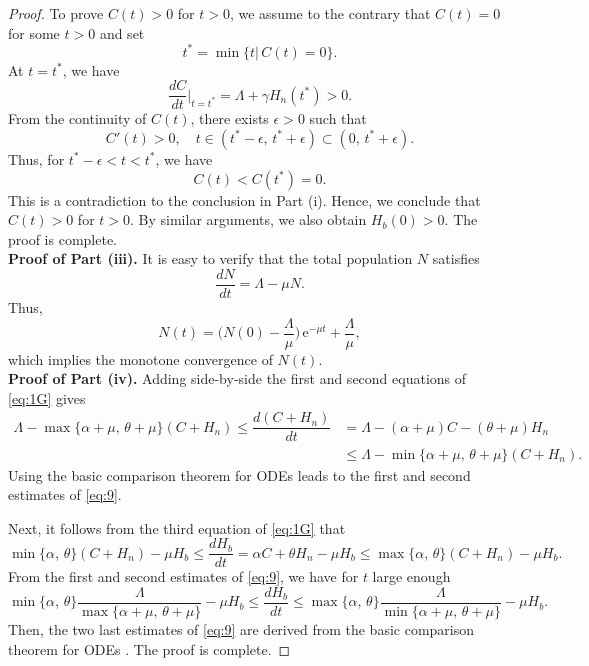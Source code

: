 \documentclass[11pt]{article}
\theoremstyle{definition}
\theoremstyle{remark}
\numberwithin{equation}{section}
\begin{document}
\begin{proof}
To prove $C(t) > 0$ for $t > 0$, we assume to the contrary that $C(t)=0$ for some $t>0$ and set 
\begin{equation*}
     t^* = \min\{t|\, C(t) = 0\}.
\end{equation*}
At $t=t^*$, we have
\begin{equation*}
     \dfrac{dC}{dt}\bigg|_{t = t^*} = \Lambda + \gamma H_n(t^*) > 0.
\end{equation*}
From the continuity of $C(t)$, there exists $\epsilon > 0$ such that
\begin{equation*}
     C'(t) > 0, \quad t \in (t^* - \epsilon,\,t^* + \epsilon) \subset (0,\,t^*+\epsilon).
\end{equation*}
Thus, for $t^* - \epsilon < t < t^*$, we have
\begin{equation*}
    C(t) < C(t^*) = 0.
\end{equation*}
This is a contradiction to the conclusion in Part (i).
Hence, we conclude that $C(t)>0$ for $t>0$. 
By similar arguments, we also obtain $H_b(0)>0$. 
The proof is complete.\\
\textbf{Proof of Part (iii).} It is easy to verify that the total population $N$ satisfies
\begin{equation*}
   \dfrac{dN}{dt} = \Lambda - \mu N.
\end{equation*}
Thus,
\begin{equation}\label{eq:8}
    N(t) = \bigg(N(0) - \dfrac{\Lambda}{\mu}\bigg)\,\mathrm{e}^{-\mu t} + \dfrac{\Lambda}{\mu},
\end{equation}
which implies the monotone convergence of $N(t)$.\\
\textbf{Proof of Part (iv).} Adding side-by-side the first and second equations of \eqref{eq:1G} gives
\begin{equation*}
\begin{split}
   \Lambda - \max\{\alpha + \mu,\,\theta + \mu\}(C + H_n) \le \dfrac{d(C + H_n)}{dt} 
   &= \Lambda - (\alpha + \mu)C - (\theta + \mu)H_n\\
   &\le\Lambda - \min\{\alpha + \mu,\,\theta + \mu\}(C + H_n).
\end{split}
\end{equation*}
Using the basic comparison theorem for ODEs \cite{McNabb} leads to the first and second estimates of \eqref{eq:9}.

Next, it follows from the third equation of \eqref{eq:1G} that 
\begin{equation*}
\min\{\alpha,\,\theta\}(C + H_n) - \mu H_b \le\dfrac{d H_b}{dt}
= \alpha C + \theta H_n - \mu H_b 
\le\max\{\alpha,\,\theta\}(C + H_n) - \mu H_b.
\end{equation*}
From the first and second estimates of \eqref{eq:9}, we have for $t$ large enough
\begin{equation*}
   \min\{\alpha,\,\theta\}\dfrac{\Lambda}{\max\{\alpha + \mu,\,\theta + \mu\}} - \mu H_b 
   \le \dfrac{dH_b}{dt} 
   \le  \max\{\alpha,\,\theta\}\dfrac{\Lambda}{\min\{\alpha + \mu,\,\theta + \mu\}} - \mu H_b.
\end{equation*}
Then, the two last estimates of \eqref{eq:9} are derived from the basic comparison theorem for ODEs \cite{McNabb}. The proof is complete.
\end{proof}
\end{document}
